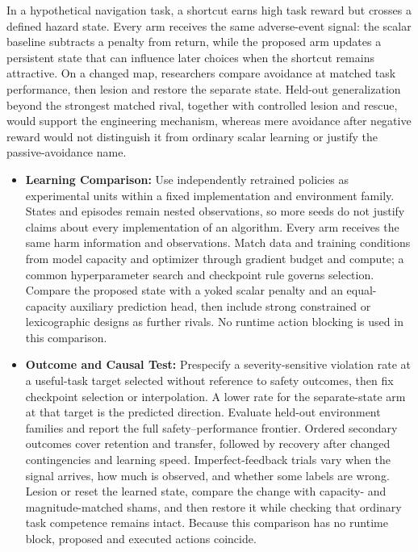\documentclass{article}
\begin{document}
In a hypothetical navigation task, a shortcut earns high task reward but crosses a defined hazard state. Every arm receives the same adverse-event signal: the scalar baseline subtracts a penalty from return, while the proposed arm updates a persistent state that can influence later choices when the shortcut remains attractive. On a changed map, researchers compare avoidance at matched task performance, then lesion and restore the separate state. Held-out generalization beyond the strongest matched rival, together with controlled lesion and rescue, would support the engineering mechanism, whereas mere avoidance after negative reward would not distinguish it from ordinary scalar learning or justify the passive-avoidance name.
\begin{itemize}
    \item \textbf{Learning Comparison:} Use independently retrained policies as experimental units within a fixed implementation and environment family. States and episodes remain nested observations, so more seeds do not justify claims about every implementation of an algorithm. Every arm receives the same harm information and observations. Match data and training conditions from model capacity and optimizer through gradient budget and compute; a common hyperparameter search and checkpoint rule governs selection. Compare the proposed state with a yoked scalar penalty and an equal-capacity auxiliary prediction head, then include strong constrained or lexicographic designs as further rivals. No runtime action blocking is used in this comparison.
    \item \textbf{Outcome and Causal Test:} Prespecify a severity-sensitive violation rate at a useful-task target selected without reference to safety outcomes, then fix checkpoint selection or interpolation. A lower rate for the separate-state arm at that target is the predicted direction. Evaluate held-out environment families and report the full safety--performance frontier. Ordered secondary outcomes cover retention and transfer, followed by recovery after changed contingencies and learning speed. Imperfect-feedback trials vary when the signal arrives, how much is observed, and whether some labels are wrong. Lesion or reset the learned state, compare the change with capacity- and magnitude-matched shams, and then restore it while checking that ordinary task competence remains intact. Because this comparison has no runtime block, proposed and executed actions coincide.

\end{itemize}
\end{document}
